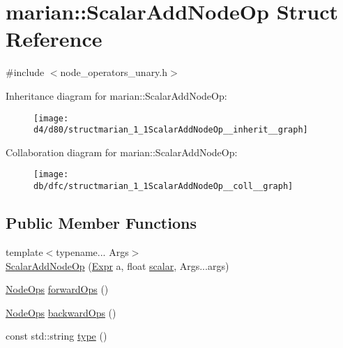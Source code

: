 \hypertarget{structmarian_1_1ScalarAddNodeOp}{}\section{marian\+:\+:Scalar\+Add\+Node\+Op Struct Reference}
\label{structmarian_1_1ScalarAddNodeOp}


{\ttfamily \#include $<$node\+\_\+operators\+\_\+unary.\+h$>$}



Inheritance diagram for marian\+:\+:Scalar\+Add\+Node\+Op\+:
\nopagebreak
\begin{figure}[H]
\begin{center}
\leavevmode
\texttt{[image: d4/d80/structmarian\_1\_1ScalarAddNodeOp\_\_inherit\_\_graph]}
\end{center}
\end{figure}


Collaboration diagram for marian\+:\+:Scalar\+Add\+Node\+Op\+:
\nopagebreak
\begin{figure}[H]
\begin{center}
\leavevmode
\texttt{[image: db/dfc/structmarian\_1\_1ScalarAddNodeOp\_\_coll\_\_graph]}
\end{center}
\end{figure}
\subsection*{Public Member Functions}
\begin{DoxyCompactItemize}
\item 
{\footnotesize template$<$typename... Args$>$ }\\\hyperlink{structmarian_1_1ScalarAddNodeOp_a0572ed21618014ece5b8b2b645eb3d61}{Scalar\+Add\+Node\+Op} (\hyperlink{namespacemarian_a498d8baf75b754011078b890b39c8e12}{Expr} a, float \hyperlink{classmarian_1_1Node_a078122f6a9c2df448139780a1e3a323b}{scalar}, Args...\+args)
\item 
\hyperlink{namespacemarian_a4956376218cc236016c20bc4071470da}{Node\+Ops} \hyperlink{structmarian_1_1ScalarAddNodeOp_a539179a95c828073b865e721140223f6}{forward\+Ops} ()
\item 
\hyperlink{namespacemarian_a4956376218cc236016c20bc4071470da}{Node\+Ops} \hyperlink{structmarian_1_1ScalarAddNodeOp_a9507deac5ac29d8b07fc950a1e7b3aff}{backward\+Ops} ()
\item 
const std\+::string \hyperlink{structmarian_1_1ScalarAddNodeOp_aea481e268815b105bd769b22d796af1d}{type} ()
\end{DoxyCompactItemize}

